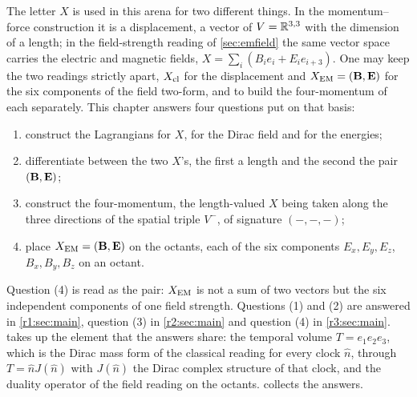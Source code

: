 The letter $X$ is used in this arena for two different things. In the momentum--force construction it is a displacement,
a vector of $V=\mathbb{R}^{3,3}$ with the dimension of a length; in the field-strength reading of \cref{sec:emfield} the same vector space
carries the electric and magnetic fields, $X=\sum_i(B_ie_i+E_ie_{i+3})$. One may keep the two
readings strictly apart, $X_{\rm cl}$ for the displacement and $X_{\rm EM}=(\mathbf B,\mathbf E)$ for the six components of the field two-form, and to
build the four-momentum of each separately. This chapter answers four questions put on that basis:
\begin{enumerate}[label=(\arabic*),leftmargin=2.2em]
\item construct the Lagrangians for $X$, for the Dirac field and for the energies;
\item differentiate between the two $X$'s, the first a length and the second the pair $(\mathbf B,\mathbf E)$;
\item construct the four-momentum, the length-valued $X$ being taken along the three directions of the spatial triple $V^-$, of signature
$(-,-,-)$;
\item place $X_{\rm EM}=(\mathbf B,\mathbf E)$ on the octants, each of the six components $E_x,E_y,E_z$, $B_x,B_y,B_z$ on an octant.
\end{enumerate}
Question (4) is read as the pair: $X_{\rm EM}$ is not a sum of two vectors but the six independent components of one field strength.
Questions (1) and (2) are answered in \cref{r1:sec:main}, question (3) in \cref{r2:sec:main} and question (4) in \cref{r3:sec:main}.
 takes up the element that the answers share: the temporal volume $T=e_1e_2e_3$, which is the Dirac mass form of the
classical reading for every clock $\hat n$, through $T=\hat nJ(\hat n)$ with $J(\hat n)$ the Dirac complex structure of that clock, and the duality operator
of the field reading on the octants.  collects the answers.

